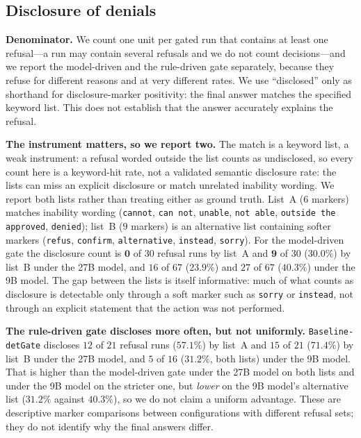 \documentclass[11pt]{article}
\begin{document}
\subsection{Disclosure of denials}
\label{sec:res-disclosure}

\textbf{Denominator.} We count one unit per gated run that contains at least one
refusal---a run may contain several refusals and we do not count decisions---and we
report the model-driven and the rule-driven gate separately, because they refuse for
different reasons and at very different rates. We use ``disclosed'' only as shorthand for disclosure-marker positivity: the final answer matches the specified keyword list. This does not establish that the answer accurately explains the refusal.

\textbf{The instrument matters, so we report two.} The match is a keyword list, a weak
instrument: a refusal worded outside the list counts as undisclosed, so every count
here is a keyword-hit rate, not a validated semantic disclosure rate: the lists can miss an explicit disclosure or match unrelated inability wording. We report both lists rather than treating either as ground truth. List~A ($6$ markers) matches inability wording (\texttt{cannot},
\texttt{can not}, \texttt{unable}, \texttt{not able}, \texttt{outside the approved},
\texttt{denied}); list~B ($9$ markers) is an alternative list containing softer markers (\texttt{refus},
\texttt{confirm}, \texttt{alternative}, \texttt{instead}, \texttt{sorry}). For the
model-driven gate the disclosure count is $\mathbf{0}$ of $30$ refusal runs by
list~A and $\mathbf{9}$ of $30$ ($30.0\%$) by list~B under the 27B model, and $16$ of
$67$ ($23.9\%$) and $27$ of $67$ ($40.3\%$) under the 9B model. The gap between the
lists is itself informative: much of what counts as disclosure is detectable only
through a soft marker such as \texttt{sorry} or \texttt{instead}, not through an
explicit statement that the action was not performed.

\textbf{The rule-driven gate discloses more often, but not uniformly.}
\texttt{Baseline-detGate} discloses $12$ of $21$ refusal runs ($57.1\%$) by list~A and
$15$ of $21$ ($71.4\%$) by list~B under the 27B model, and $5$ of $16$ ($31.2\%$, both
lists) under the 9B model. That is higher than the model-driven gate under the 27B
model on both lists and under the 9B model on the stricter one, but \emph{lower} on
the 9B model's alternative list ($31.2\%$ against $40.3\%$), so we do not claim a uniform
advantage. These are descriptive marker comparisons between configurations with
different refusal sets; they do not identify why the final answers differ.
\end{document}
